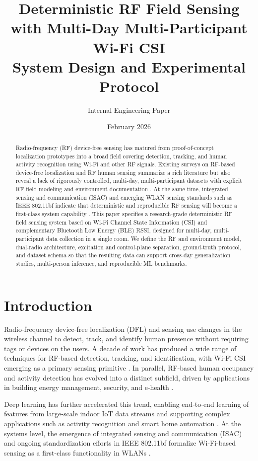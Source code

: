 \documentclass[11pt,a4paper]{article}
\title{Deterministic RF Field Sensing with Multi-Day Multi-Participant Wi-Fi CSI\\
System Design and Experimental Protocol}
\author{Internal Engineering Paper}
\date{February 2026}
\begin{document}
\maketitle

\begin{abstract}
Radio-frequency (RF) device-free sensing has matured from proof-of-concept localization prototypes into a broad field covering detection, tracking, and human activity recognition using Wi-Fi and other RF signals. Existing surveys on RF-based device-free localization and RF human sensing summarize a rich literature but also reveal a lack of rigorously controlled, multi-day, multi-participant datasets with explicit RF field modeling and environment documentation \cite{denis2019dfl,shahbazian2023human}. At the same time, integrated sensing and communication (ISAC) and emerging WLAN sensing standards such as IEEE 802.11bf indicate that deterministic and reproducible RF sensing will become a first-class system capability \cite{wang2022isac,du2023bf}. This paper specifies a research-grade deterministic RF field sensing system based on Wi-Fi Channel State Information (CSI) and complementary Bluetooth Low Energy (BLE) RSSI, designed for multi-day, multi-participant data collection in a single room. We define the RF and environment model, dual-radio architecture, excitation and control-plane separation, ground-truth protocol, and dataset schema so that the resulting data can support cross-day generalization studies, multi-person inference, and reproducible ML benchmarks.
\end{abstract}

\section{Introduction}

Radio-frequency device-free localization (DFL) and sensing use changes in the wireless channel to detect, track, and identify human presence without requiring tags or devices on the users. A decade of work has produced a wide range of techniques for RF-based detection, tracking, and identification, with Wi-Fi CSI emerging as a primary sensing primitive \cite{denis2019dfl}. In parallel, RF-based human occupancy and activity detection has evolved into a distinct subfield, driven by applications in building energy management, security, and e-health \cite{shahbazian2023human}.

Deep learning has further accelerated this trend, enabling end-to-end learning of features from large-scale indoor IoT data streams and supporting complex applications such as activity recognition and smart home automation \cite{abdelbasset2021indoor}. At the systems level, the emergence of integrated sensing and communication (ISAC) and ongoing standardization efforts in IEEE 802.11bf formalize Wi-Fi-based sensing as a first-class functionality in WLANs \cite{wang2022isac,du2023bf}.
\end{document}

